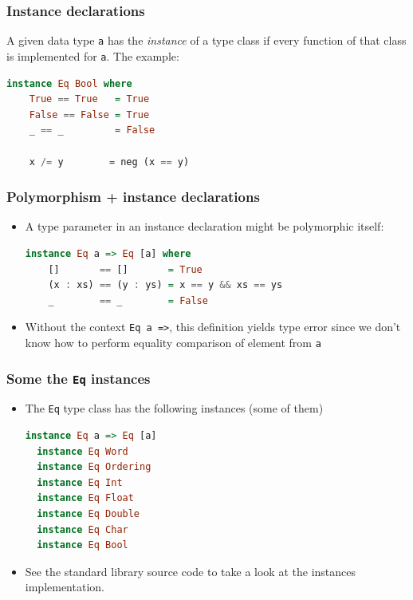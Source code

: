 \documentclass[10pt,pdf,utf8,russian,aspectratio=169]{beamer}
\begin{document}
\begin{frame}[fragile]
  \frametitle{Instance declarations}

  A given data type \verb"a" has the \emph{instance} of a type class if every function of that class is implemented for \verb"a". The example:

  \begin{lstlisting}[language=Haskell]
  instance Eq Bool where
    True == True   = True
    False == False = True
    _ == _         = False

    x /= y        = neg (x == y)
  \end{lstlisting}
\end{frame}

\begin{frame}[fragile]
  \frametitle{Polymorphism + instance declarations}

\begin{itemize}
  \item A type parameter in an instance declaration might be polymorphic itself:

  \begin{lstlisting}[language=Haskell]
  instance Eq a => Eq [a] where
    []       == []       = True
    (x : xs) == (y : ys) = x == y && xs == ys
    _        == _        = False
  \end{lstlisting}
  \item Without the context \verb"Eq a =>", this definition yields type error since we don't know how to perform
  equality comparison of element from \verb"a"
\end{itemize}
\end{frame}

\begin{frame}[fragile]
  \frametitle{Some the \verb"Eq" instances}

\begin{itemize}
\item The \verb"Eq" type class has the following instances (some of them)

  \begin{lstlisting}[language=Haskell]
  instance Eq a => Eq [a]
  instance Eq Word
  instance Eq Ordering
  instance Eq Int
  instance Eq Float
  instance Eq Double
  instance Eq Char
  instance Eq Bool
  \end{lstlisting}
\item See the standard library source code to take a look at the instances implementation.
\end{itemize}
\end{frame}
\end{document}
